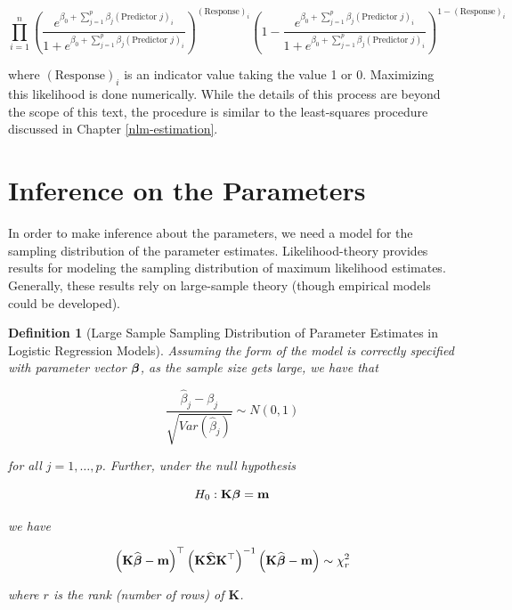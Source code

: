\documentclass[
]{book}
\theoremstyle{plain}
\theoremstyle{mydefn}
\newtheorem{definition}{Definition}[chapter]
\theoremstyle{myexmpl}
\theoremstyle{remark}
\begin{document}
\[\prod_{i=1}^{n} \left(\frac{e^{\beta_0 + \sum_{j=1}^{p} \beta_j (\text{Predictor } j)_i}}{1 + e^{\beta_0 + \sum_{j=1}^{p} \beta_j (\text{Predictor } j)_i}}\right)^{(\text{Response})_i}\left(1 - \frac{e^{\beta_0 + \sum_{j=1}^{p} \beta_j (\text{Predictor } j)_i}}{1 + e^{\beta_0 + \sum_{j=1}^{p} \beta_j (\text{Predictor } j)_i}}\right)^{1 - (\text{Response})_i}\]

where \((\text{Response})_i\) is an indicator value taking the value 1 or 0. Maximizing this likelihood is done numerically. While the details of this process are beyond the scope of this text, the procedure is similar to the least-squares procedure discussed in Chapter \ref{nlm-estimation}.

\hypertarget{inference-on-the-parameters}{%
\section{Inference on the Parameters}\label{inference-on-the-parameters}}

In order to make inference about the parameters, we need a model for the sampling distribution of the parameter estimates. Likelihood-theory provides results for modeling the sampling distribution of maximum likelihood estimates. Generally, these results rely on large-sample theory (though empirical models could be developed).

\begin{definition}[Large Sample Sampling Distribution of Parameter Estimates in Logistic Regression Models]
\protect\hypertarget{def:nlm-logistic-samp-distns}{}{\label{def:nlm-logistic-samp-distns} {} }Assuming the form of the model is correctly specified with parameter vector \(\boldsymbol{\beta}\), as the sample size gets large, we have that

\[\frac{\widehat{\beta}_j - \beta_j}{\sqrt{Var\left(\widehat{\beta}_j\right)}} \sim N(0, 1)\]

for all \(j = 1, \dotsc, p\). Further, under the null hypothesis

\[H_0: \mathbf{K}\boldsymbol{\beta} = \mathbf{m}\]

we have

\[\left(\mathbf{K}\widehat{\boldsymbol{\beta}} - \mathbf{m}\right)^\top \left(\mathbf{K}\widehat{\boldsymbol{\Sigma}}\mathbf{K}^\top\right)^{-1} \left(\mathbf{K}\widehat{\boldsymbol{\beta}} - \mathbf{m}\right) \sim \chi^2_r\]

where \(r\) is the rank (number of rows) of \(\bm{K}\).
\end{definition}
\end{document}
